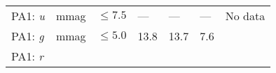 \documentclass[DM, lsstdraft, toc]{lsstdoc}
\begin{document}
\begin{longtable}[]{@{}lllllll@{}}
\begin{minipage}[t]{0.12\columnwidth}\raggedright\strut
PA1: \emph{u}\strut
\end{minipage} & \begin{minipage}[t]{0.06\columnwidth}\raggedright\strut
mmag\strut
\end{minipage} & \begin{minipage}[t]{0.14\columnwidth}\raggedright\strut
\(\leq 7.5\)\strut
\end{minipage} & \begin{minipage}[t]{0.12\columnwidth}\raggedright\strut
---\strut
\end{minipage} & \begin{minipage}[t]{0.12\columnwidth}\raggedright\strut
--- \strut
\end{minipage} & \begin{minipage}[t]{0.12\columnwidth}\raggedright\strut
--- \strut
\end{minipage} & \begin{minipage}[t]{0.17\columnwidth}\raggedright\strut
No data\strut
\end{minipage}\tabularnewline
\begin{minipage}[t]{0.12\columnwidth}\raggedright\strut
PA1: \emph{g}\strut
\end{minipage} & \begin{minipage}[t]{0.06\columnwidth}\raggedright\strut
mmag\strut
\end{minipage} & \begin{minipage}[t]{0.14\columnwidth}\raggedright\strut
\(\leq 5.0\)\strut
\end{minipage} & \begin{minipage}[t]{0.12\columnwidth}\raggedright\strut
13.8\strut
\end{minipage} & \begin{minipage}[t]{0.12\columnwidth}\raggedright\strut
13.7 \strut
\end{minipage} & \begin{minipage}[t]{0.12\columnwidth}\raggedright\strut
7.6 \strut
\end{minipage} & \begin{minipage}[t]{0.17\columnwidth}\raggedright\strut
\strut
\end{minipage}\tabularnewline
\begin{minipage}[t]{0.12\columnwidth}\raggedright\strut
PA1: \emph{r}\strut
\end{minipage} & \begin{minipage}[t]{0.06\columnwidth}\raggedright\strut

\end{minipage}
\end{longtable}
\end{document}
